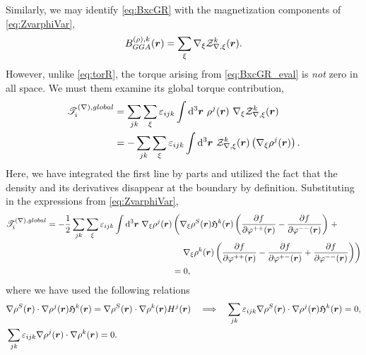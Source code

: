 Similarly, we may identify \cref{eq:BxcGR} with the magnetization components of \cref{eq:ZvarphiVar},
\begin{equation}
B^{(\rho),k}_{GGA}(\boldsymbol{r}) = \sum_\xi \nabla_\xi \mathcal{Z}^k_{\nabla,\xi}(\boldsymbol{r}) \label{eq:BxcGR_eval} .
\end{equation}
However, unlike  \cref{eq:torR}, the torque arising from \cref{eq:BxcGR_eval} is \emph{not} zero in all space. We must them examine its global torque contribution,
\begin{align}
  \mathscr{T}_i^{(\nabla), global} 
    &= \sum_{jk} \sum_\xi \varepsilon_{ijk} \int\mathrm{d}^3\boldsymbol{r}\text{   } \rho^j(\boldsymbol{r}) \text{ }\nabla_\xi \mathcal{Z}^k_{\nabla,\xi}(\boldsymbol{r}) \nonumber \\
    &= -\sum_{jk} \sum_\xi \varepsilon_{ijk} \int\mathrm{d}^3\boldsymbol{r}\text{   } \mathcal{Z}^k_{\nabla,\xi}(\boldsymbol{r}) \left(\nabla_\xi \rho^j(\boldsymbol{r})\right) .
\end{align}
Here, we have integrated the first line by parts and utilized the fact that the density and its derivatives disappear at the boundary by definition.
Substituting in the expressions from \cref{eq:ZvarphiVar},
\begin{align}
  \mathscr{T}_i^{(\nabla), global} 
    = -\frac{1}{2}\sum_{jk} \sum_\xi \varepsilon_{ijk} \int\mathrm{d}^3\boldsymbol{r}\text{   } 
    \nabla_\xi \rho^j(\boldsymbol{r})
    &\left(
      \nabla_\xi\rho^S(\boldsymbol{r}) \mathfrak H^k(\boldsymbol{r})  \left( \dfrac{\partial f}{\partial \varphi^{++}(\boldsymbol{r})} - \dfrac{\partial f}{\partial \varphi^{--}(\boldsymbol{r})} \right) 
       \right. +\nonumber\\ & \quad \left. \nabla_\xi\rho^k(\boldsymbol{r})
      \left(\dfrac{\partial f}{\partial \varphi^{++}(\boldsymbol{r})} - \dfrac{\partial f}{\partial \varphi^{+-}(\boldsymbol{r})} + \dfrac{\partial f}{\partial \varphi^{--}(\boldsymbol{r})} \right)
    \right) \nonumber \\
    &= 0,
\end{align}
where we have used the following relations
\begin{align}
&\nabla \rho^S(\boldsymbol{r}) \cdot \nabla \rho^j(\boldsymbol{r}) \mathfrak H^k(\boldsymbol{r}) = \nabla \rho^S(\boldsymbol{r}) \cdot \nabla \rho^k (\boldsymbol{r})H^j(\boldsymbol{r})  \quad \Longrightarrow \quad
  \sum_{jk} \varepsilon_{ijk} \nabla \rho^S(\boldsymbol{r}) \cdot \nabla \rho^j(\boldsymbol{r}) \mathfrak H^k(\boldsymbol{r}) = 0, \\
& \sum_{jk}\varepsilon_{ijk} \nabla \rho^j(\boldsymbol{r}) \cdot \nabla \rho^k(\boldsymbol{r}) = 0.
\end{align}
 
